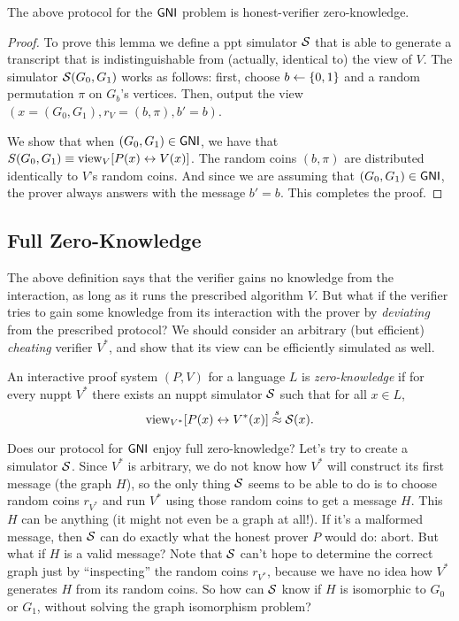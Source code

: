 \documentclass[11pt]{article}
\begin{document}
\begin{lemma}
  \label{lem:gni-hvzk}
  The above protocol for the $\mathsf{GNI}$ problem is honest-verifier
  zero-knowledge.
\end{lemma}

\begin{proof}
  To prove this lemma we define a ppt simulator $\mathcal{S}$ that is able to
  generate a transcript that is indistinguishable from (actually,
  identical to) the view of $V$. The simulator $\mathcal{S}(G_{0}, G_{1})$
  works as follows: first, choose $b \gets \{0,1\}$ and a random
  permutation $\pi$ on $G_{b}$'s vertices.  Then, output the view $(x
  = (G_{0}, G_{1}), r_V=(b,\pi), b' = b)$.
  
  We show that when $(G_0,G_1) \in \mathsf{GNI}$, we have that $S(G_0,G_1)
  \equiv \text{view}_V[P(x)\leftrightarrow V(x)]$.  The random coins
  $(b,\pi)$ are distributed identically to $V$'s random coins.  And
  since we are assuming that $(G_0,G_1) \in \mathsf{GNI}$, the prover always
  answers with the message $b'=b$.  This completes the proof.
\end{proof}

\subsection{Full Zero-Knowledge}
\label{sec:full-zero-knowledge}

The above definition says that the verifier gains no knowledge from
the interaction, as long as it runs the prescribed algorithm $V$.  But
what if the verifier tries to gain some knowledge from its interaction
with the prover by \emph{deviating} from the prescribed protocol?  We
should consider an arbitrary (but efficient) \emph{cheating} verifier
$V^{*}$, and show that its view can be efficiently simulated as well.

\begin{definition}
  \label{def:zk}
  An interactive proof system $(P,V)$ for a language $L$ is
  \emph{zero-knowledge} if for every nuppt $V^{*}$ there exists an
  nuppt simulator $\mathcal{S}$ such that for all $x \in L$, \[ \text{view}_{V^{*}}[
  P(x) \leftrightarrow V^{*}(x) ] \stackrel{s}{\approx} \mathcal{S}(x). \]
\end{definition}

Does our protocol for $\mathsf{GNI}$ enjoy full zero-knowledge?  Let's try to
create a simulator $\mathcal{S}$.  Since $V^{*}$ is arbitrary, we do not know
how $V^*$ will construct its first message (the graph $H$), so the
only thing $\mathcal{S}$ seems to be able to do is to choose random coins
$r_{V^*}$ and run $V^*$ using those random coins to get a message $H$.
This $H$ can be anything (it might not even be a graph at all!).  If
it's a malformed message, then $\mathcal{S}$ can do exactly what the honest
prover $P$ would do: abort.  But what if $H$ is a valid message?  Note
that $\mathcal{S}$ can't hope to determine the correct graph just by
``inspecting'' the random coins $r_{V^{*}}$, because we have no idea
how $V^{*}$ generates $H$ from its random coins.  So how can $\mathcal{S}$
know if $H$ is isomorphic to $G_0$ or $G_1$, without solving the graph
isomorphism problem?
\end{document}
